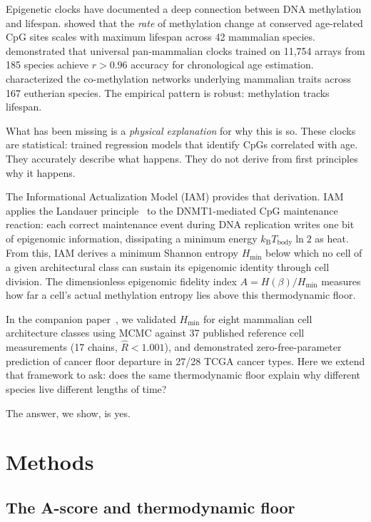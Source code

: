 \documentclass[11pt,a4paper]{article}
\newcommand{\Hmin}{H_{\min}}
\newcommand{\Ascore}{A}
\newcommand{\kB}{k_{\mathrm{B}}}
\newcommand{\Tbody}{T_{\mathrm{body}}}
\begin{document}
Epigenetic clocks have documented a deep connection between DNA methylation
and lifespan. \citet{Lowe2018} showed that the \emph{rate} of methylation change
at conserved age-related CpG sites scales with maximum lifespan across 42
mammalian species. \citet{Lu2023} demonstrated that universal pan-mammalian
clocks trained on 11,754 arrays from 185 species achieve $r > 0.96$ accuracy
for chronological age estimation. \citet{Haghani2023} characterized the
co-methylation networks underlying mammalian traits across 167 eutherian species.
The empirical pattern is robust: methylation tracks lifespan.

What has been missing is a \emph{physical explanation} for why this is so.
These clocks are statistical: trained regression models that identify CpGs
correlated with age. They accurately describe what happens. They do not derive
from first principles why it happens.

The Informational Actualization Model (IAM) provides that derivation. IAM
applies the Landauer principle~\citep{Landauer1961} to the DNMT1-mediated CpG
maintenance reaction: each correct maintenance event during DNA replication
writes one bit of epigenomic information, dissipating a minimum energy
$\kB \Tbody \ln 2$ as heat. From this, IAM derives a minimum Shannon entropy
$\Hmin$ below which no cell of a given architectural class can sustain its
epigenomic identity through cell division. The dimensionless epigenomic
fidelity index $\Ascore = H(\beta)/\Hmin$ measures how far a cell's actual
methylation entropy lies above this thermodynamic floor.

In the companion paper~\citep{Mahaffey2026}, we validated $\Hmin$ for eight
mammalian cell architecture classes using MCMC against 37 published reference
cell measurements (17 chains, $\hat{R} < 1.001$), and demonstrated zero-free-parameter
prediction of cancer floor departure in 27/28 TCGA cancer types. Here we
extend that framework to ask: does the same thermodynamic floor explain why
different species live different lengths of time?

The answer, we show, is yes.

\section{Methods}

\subsection{The A-score and thermodynamic floor}
\end{document}
